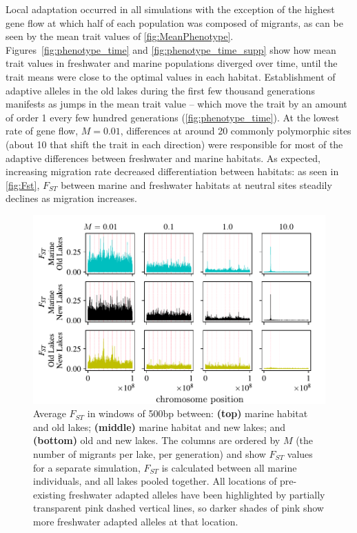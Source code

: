 \documentclass{article}
\begin{document}
Local adaptation occurred in all simulations with the exception of the highest gene flow at which half of each population was composed of migrants, 
as can be seen by the mean trait values of \autoref{fig:MeanPhenotype}.
Figures~\ref{fig:phenotype_time} and \ref{fig:phenotype_time_supp} show how mean trait values in freshwater and marine populations diverged over time, until the trait means were close to the optimal values in each habitat. 
Establishment of adaptive alleles in the old lakes during the first few thousand generations manifests as jumps in the mean trait value -- which move the trait by an amount of order 1 every few hundred generations (\autoref{fig:phenotype_time}). 
At the lowest rate of gene flow, $M = 0.01$, differences at around 20 commonly polymorphic sites (about 10 that shift the trait in each direction) were responsible for most of the adaptive differences between freshwater and marine habitats. 
As expected, increasing migration rate decreased differentiation between habitats: as seen in \autoref{fig:Fst}, $F_{ST}$ between marine and freshwater habitats at neutral sites steadily declines as migration increases. 

\begin{figure}
    \begin{center}
        \includegraphics[width=\textwidth]{Final_Plots/Fst_Genome_faa.pdf}
          \caption{
        Average $F_{ST}$ in windows of 500bp between:
        \textbf{(top)} marine habitat and old lakes;
        \textbf{(middle)} marine habitat and new lakes; and
        \textbf{(bottom)} old and new lakes.
        The columns are ordered by $M$ (the number of migrants per lake, per generation) 
        and show $F_{ST}$ values for a separate simulation,
        $F_{ST}$ is calculated between all marine individuals, and all lakes pooled together.
        All locations of pre-existing freshwater adapted alleles have been highlighted by 
        partially transparent pink dashed vertical lines, so darker shades of pink show more 
        freshwater adapted alleles at that location.
     } \label{fig:Fst}
    \end{center}
\end{figure}
\end{document}
